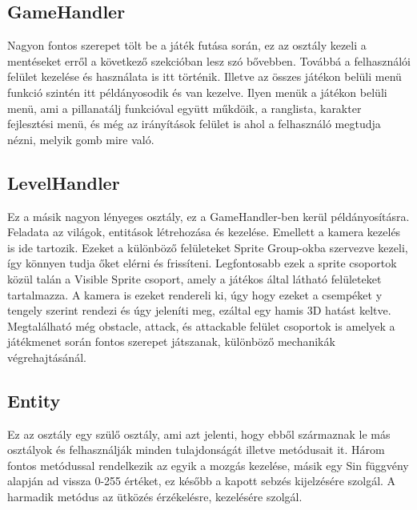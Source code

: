 \subsection{GameHandler}
Nagyon fontos szerepet tölt be a játék futása során, ez az osztály kezeli a mentéseket erről a következő szekcióban lesz szó bővebben. 
Továbbá a felhasználói felület kezelése és használata is itt történik. Illetve az összes játékon belüli menü funkció szintén itt példányosodik és van kezelve. Ilyen menük a játékon belüli menü, ami a pillanatálj funkcióval együtt műkdöik, a ranglista, karakter fejlesztési menü, és még az irányítások felület is ahol a felhasználó megtudja nézni, melyik gomb mire való.

\subsection{LevelHandler}
Ez a másik nagyon lényeges osztály, ez a GameHandler-ben kerül példányosításra. Feladata az világok, entitások létrehozása és kezelése. Emellett a kamera kezelés is ide tartozik. 
Ezeket a különböző felületeket Sprite Group-okba szervezve kezeli, így könnyen tudja őket elérni és frissíteni.
Legfontosabb ezek a sprite csoportok közül talán a Visible Sprite csoport, amely a játékos által látható felületeket tartalmazza. A kamera is ezeket rendereli ki, úgy hogy ezeket a csempéket y tengely szerint rendezi és úgy jeleníti meg, ezáltal egy hamis 3D hatást keltve.
Megtalálható még obstacle, attack, és attackable felület csoportok is amelyek a játékmenet során fontos szerepet játszanak, különböző mechanikák végrehajtásánál.


\subsection{Entity}
Ez az osztály egy szülő osztály, ami azt jelenti, hogy ebből származnak le más osztályok és felhasználják minden tulajdonságát illetve metódusait it.  
Három fontos metódussal rendelkezik az egyik a mozgás kezelése, másik egy Sin függvény alapján ad vissza 0-255 értéket, ez később a kapott sebzés kijelzésére szolgál. A harmadik metódus az ütközés érzékelésre, kezelésére szolgál.

